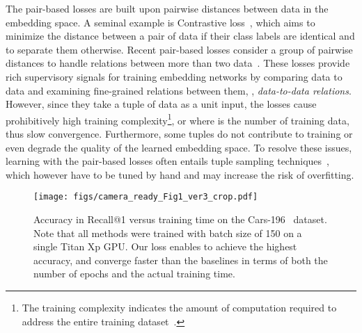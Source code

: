 \documentclass[10pt,twocolumn,letterpaper]{article}
\begin{document}
The pair-based losses are built upon pairwise distances between data in the embedding space.
A seminal example is Contrastive loss~\cite{Chopra2005,Hadsell2006}, which aims to minimize the distance between a pair of data if their class labels are identical and to separate them otherwise.
Recent pair-based losses consider a group of pairwise distances to handle relations between more than two data~\cite{Schroff2015,Wang2014,songCVPR16,Sohn_nips2016,Yu_2019_ICCV,wang2019multi,wang2019ranked,kim2019deep}.
These losses provide rich supervisory signals for training embedding networks by comparing data to data and examining fine-grained relations between them, \ie, \emph{data-to-data relations}.
However, since they take a tuple of data as a unit input, the losses cause prohibitively high training complexity\footnote{The training complexity indicates the amount of computation required to address the entire training dataset~\cite{aziere2019ensemble, Do_2019_CVPR, Harwood_2017_ICCV, Qian_2019_ICCV, wang2019ranked}.},  or  where  is the number of training data, thus slow convergence.
Furthermore, some tuples do not contribute to training or even degrade the quality of the learned embedding space.
To resolve these issues, learning with the pair-based losses often entails tuple sampling techniques~\cite{Schroff2015,sampling_matters,Yuan_2017_ICCV,Harwood_2017_ICCV}, which however have to be tuned by hand and may increase the risk of overfitting.




\begin{figure} [!t]
\centering
\texttt{[image: figs/camera\_ready\_Fig1\_ver3\_crop.pdf]}
\caption{
Accuracy in Recall@1 versus training time on the Cars-196~\cite{krause20133d} dataset. Note that all methods were trained with batch size of 150 on a single Titan Xp GPU.
Our loss enables to achieve the highest accuracy, and converge faster than the baselines in terms of both the number of epochs and the actual training time.
} 
\label{fig:convergence}
\vspace{-1mm}
\end{figure}
\end{document}
